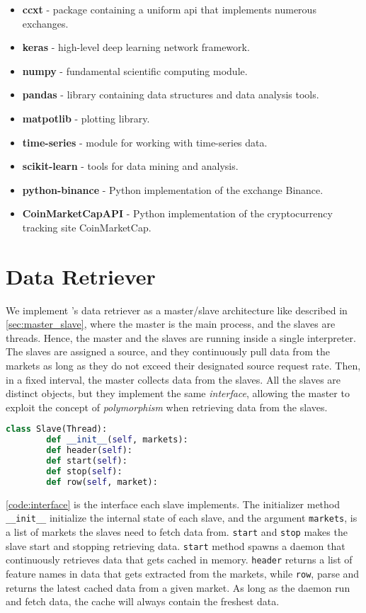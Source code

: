 \begin{itemize}
    \item \textbf{ccxt} - package containing a uniform \ac{api} that implements numerous exchanges.
    \item \textbf{keras} - high-level deep learning network framework.
    \item \textbf{numpy} - fundamental scientific computing module.
    \item \textbf{pandas} - library containing data structures and data analysis tools.
    \item \textbf{matpotlib} - plotting library.
    \item \textbf{time-series} - module for working with time-series data.  
    \item \textbf{scikit-learn} - tools for data mining and analysis.
    \item \textbf{python-binance} - Python implementation of the exchange Binance.
    \item \textbf{CoinMarketCapAPI} - Python implementation of the cryptocurrency tracking site CoinMarketCap.
\end{itemize}

\section{Data Retriever}
We implement \project's data retriever as a master/slave architecture like described in \autoref{sec:master_slave}, where the master is the main process, and the slaves are threads. Hence, the master and the slaves are running inside a single interpreter. The slaves are assigned a source, and they continuously pull data from the markets as long as they do not exceed their designated source request rate. Then, in a fixed interval, the master collects data from the slaves. All the slaves are distinct objects, but they implement the same \emph{interface}, allowing the master to exploit the concept of \emph{polymorphism} when retrieving data from the slaves.

\newpage
\begin{lstlisting}[language=python, caption={Data retriever's slave interface}, label=code:interface]
    class Slave(Thread):
        def __init__(self, markets):
        def header(self):
        def start(self):
        def stop(self):
        def row(self, market):
\end{lstlisting}

\autoref{code:interface} is the interface each slave implements. The initializer method \texttt{\_\_init\_\_} initialize the internal state of each slave, and the argument \texttt{markets}, is a list of markets the slaves need to fetch data from. \texttt{start} and \texttt{stop} makes the slave start and stopping retrieving data. \texttt{start} method spawns a daemon that continuously retrieves data that gets cached in memory. \texttt{header} returns a list of feature names in data that gets extracted from the markets, while \texttt{row}, parse and returns the latest cached data from a given market. As long as the daemon run and fetch data, the cache will always contain the freshest data.

